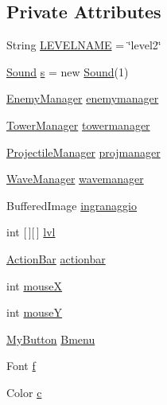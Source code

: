 \subsection*{Private Attributes}
\begin{DoxyCompactItemize}
\item 
String \hyperlink{classscenes_1_1_level2_a4965d4285aad63d850d0917b23e3f11f}{L\+E\+V\+E\+L\+N\+A\+ME} = \char`\"{}level2\char`\"{}
\item 
\hyperlink{classprogetto_1_1_sound}{Sound} \hyperlink{classscenes_1_1_level2_a76e9e53c877d84187e0efb78f03c86d4}{s} = new \hyperlink{classprogetto_1_1_sound}{Sound}(1)
\item 
\hyperlink{classmanagers_1_1_enemy_manager}{Enemy\+Manager} \hyperlink{classscenes_1_1_level2_a1f593b74cc45d79b21ce59953aa8118f}{enemymanager}
\item 
\hyperlink{classmanagers_1_1_tower_manager}{Tower\+Manager} \hyperlink{classscenes_1_1_level2_a1340930f4499459346af3af2d24e3d3e}{towermanager}
\item 
\hyperlink{classmanagers_1_1_projectile_manager}{Projectile\+Manager} \hyperlink{classscenes_1_1_level2_aee34cf906685787259a2edd7d4559863}{projmanager}
\item 
\hyperlink{classmanagers_1_1_wave_manager}{Wave\+Manager} \hyperlink{classscenes_1_1_level2_a53367ff9cb3d994463429a1103e0ce6a}{wavemanager}
\item 
Buffered\+Image \hyperlink{classscenes_1_1_level2_ab0c4ea45989823c211fa4034d743f36b}{ingranaggio}
\item 
int \mbox{[}$\,$\mbox{]}\mbox{[}$\,$\mbox{]} \hyperlink{classscenes_1_1_level2_a4b06a2210cf5b93dda77f2a9a061d538}{lvl}
\item 
\hyperlink{classui_1_1_action_bar}{Action\+Bar} \hyperlink{classscenes_1_1_level2_aa73d545c6ea02ea24a244ba02a329b28}{actionbar}
\item 
int \hyperlink{classscenes_1_1_level2_a85ea1b63086b31a15d3ed2579c5715a6}{mouseX}
\item 
int \hyperlink{classscenes_1_1_level2_a3637abebcaa9d04aa18b1610d0921e16}{mouseY}
\item 
\hyperlink{classui_1_1_my_button}{My\+Button} \hyperlink{classscenes_1_1_level2_a3bcc199bdb1d50c111054398694c7473}{Bmenu}
\item 
Font \hyperlink{classscenes_1_1_level2_a3fb562f10e8f7f83cb2ed130eab6d439}{f}
\item 
Color \hyperlink{classscenes_1_1_level2_a02094092ae89aa4b23bff1976bcbf90d}{c}
\item 

\end{DoxyCompactItemize}
